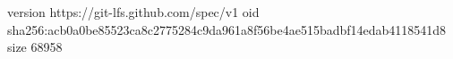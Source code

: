 version https://git-lfs.github.com/spec/v1
oid sha256:acb0a0be85523ca8c2775284c9da961a8f56be4ae515badbf14edab4118541d8
size 68958
